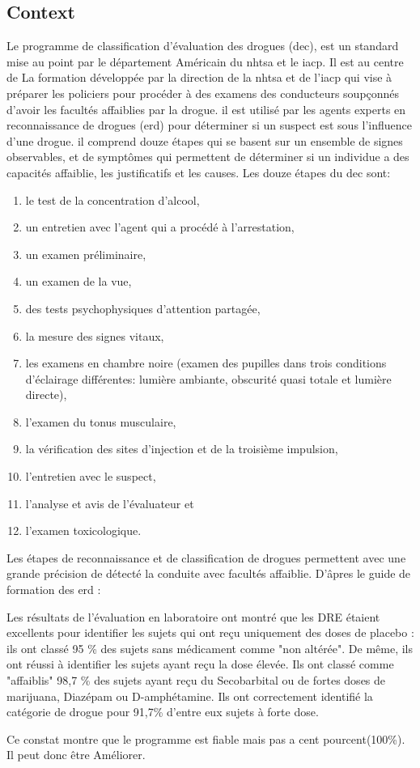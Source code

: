 \documentclass[12pt]{report}
\begin{document}
\subsection{Context}
 Le programme de classification d'évaluation des drogues (\acrshort{dec}), est un standard mise au point par le département Américain du \acrfull{nhtsa}  et le \acrshort{iacp}. Il est au centre de La formation développée par la direction de la \acrshort{nhtsa} et de l'\acrshort{iacp} qui vise à préparer les policiers pour procéder à des examens des conducteurs soupçonnés d'avoir les facultés affaiblies par la drogue. il est utilisé par les agents experts en reconnaissance de drogues (\acrshort{erd}) pour déterminer si un suspect est sous l’influence d’une drogue. il comprend douze étapes qui se basent sur un ensemble de signes observables, et de symptômes qui permettent de déterminer si un individue a des capacités affaiblie, les justificatifs et les causes. Les douze étapes du \acrshort{dec} sont: 
\begin{enumerate}
    \item le test de la concentration d'alcool,
    \item un entretien avec l'agent qui a procédé à l'arrestation,
    \item un examen préliminaire,
    \item un examen de la vue,
    \item des tests psychophysiques d'attention partagée,
    \item la mesure des signes vitaux,
    \item les examens en chambre noire (examen des pupilles dans trois conditions d'éclairage différentes: lumière ambiante, obscurité quasi totale et lumière directe),
    \item l'examen du tonus musculaire,
    \item la vérification des sites d'injection et de la troisième impulsion,
    \item l'entretien avec le suspect,
    \item l'analyse et avis de l'évaluateur et
    \item l'examen toxicologique.
\end{enumerate}
Les étapes de reconnaissance et de classification de drogues permettent avec une grande précision de détecté la conduite avec facultés affaiblie. D’âpres le guide de formation des \acrshort{erd} \cite{dre:administrator}: 
\begin{ex}
Les résultats de l'évaluation en laboratoire ont montré que les DRE étaient excellents pour identifier les sujets qui ont reçu uniquement des doses de placebo : ils ont classé 95 \% des sujets sans médicament comme "non altérée". De même, ils ont réussi à identifier les sujets ayant reçu la dose élevée. Ils ont classé comme "affaiblis" 98,7 \% des sujets ayant reçu du Secobarbital ou de fortes doses de marijuana, Diazépam ou D-amphétamine. Ils ont correctement identifié la catégorie de drogue pour 91,7\% d'entre eux sujets à forte dose.\cite{dre:administrator}
\end{ex} Ce constat montre que le programme est fiable mais pas a cent pourcent(100\%). Il peut donc être Améliorer.
\end{document}
